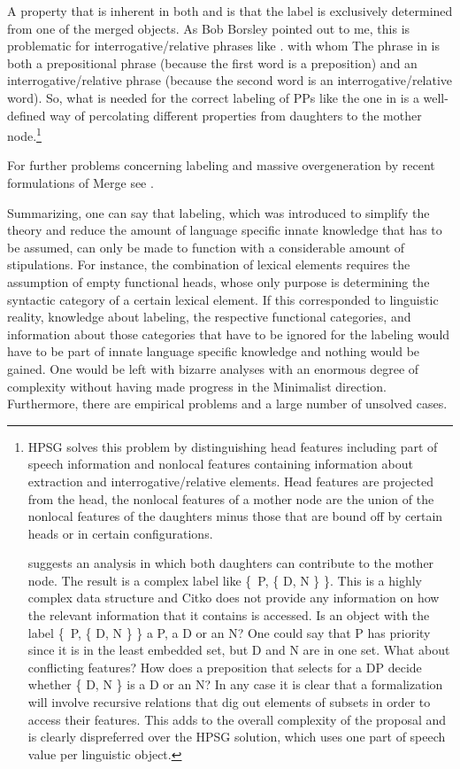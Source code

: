 \largerpage
A property that is inherent in both  and  is that the label
is exclusively determined from one of the merged objects. As Bob Borsley pointed out to me, this is
problematic for interrogative/relative phrases like .
\ea
with whom
\z
The phrase in  is both a prepositional phrase (because the first word is a preposition) and
an interrogative/relative phrase (because the second word is an interrogative/relative word). So, what
is needed for the correct labeling of PPs like the one in  is a well-defined way of
percolating different properties from daughters to the mother node.\footnote{%
HPSG solves this problem by
distinguishing head features including part of speech information and nonlocal features containing
information about extraction and interrogative/relative elements. Head features are projected from
the head, the nonlocal features of a mother node are the union of the nonlocal features of the
daughters minus those that are bound off by certain heads or in certain configurations.

\citet[]{Citko2008a} suggests an analysis in which both daughters can contribute to the
mother node. The result is a complex label like \{~P, \{ D, N \} \}. This is a highly complex data
structure and Citko does not provide any information on how the relevant information that it
contains is accessed. Is an object with the label \{~P, \{ D, N \} \} a P, a D or an N? One could
say that P has priority since it is in the least embedded set, but D and N are in one set. What about
conflicting features? How does a preposition that selects for a DP decide whether \{ D, N \} is a D
or an N? In any case it is clear that a formalization will involve recursive relations that dig out
elements of subsets in order to access their features. This adds to the overall complexity of the
proposal and is clearly dispreferred over the HPSG solution, which uses one part of speech value per linguistic object.
}

For further problems concerning labeling and massive overgeneration by recent formulations of Merge
see .

Summarizing, one can say that labeling, which was introduced to simplify the theory and reduce the
amount of language specific innate knowledge that has to be assumed, can only be made to function with a
considerable amount of stipulations. For instance, the combination of lexical elements requires the
assumption of empty functional heads, whose only purpose is determining the syntactic
category of a certain lexical element. If this corresponded to linguistic reality, knowledge
about labeling, the respective functional categories, and information about those categories that
have to be ignored for the labeling would have to be part of innate language specific knowledge and
nothing would be gained. One would be left with bizarre analyses with an enormous degree of complexity without
having made progress in the Minimalist direction. Furthermore, there are empirical problems and
a large number of unsolved cases.

